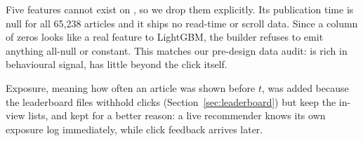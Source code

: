 Five features cannot exist on \mind{}, so we drop them explicitly. Its publication time is null
for all 65,238 articles and it ships no read-time or scroll data. Since a column of zeros
looks like a real feature to LightGBM, the builder refuses to emit anything all-null or constant.
This matches our pre-design data audit: \eb{} is rich in behavioural signal, \mind{} has little
beyond the click itself.

Exposure, meaning how often an article was shown before $t$, was added because the leaderboard
files withhold clicks (Section~\ref{sec:leaderboard}) but keep the in-view lists, and
kept for a better reason: a live recommender knows its own exposure log immediately, while click
feedback arrives later.
